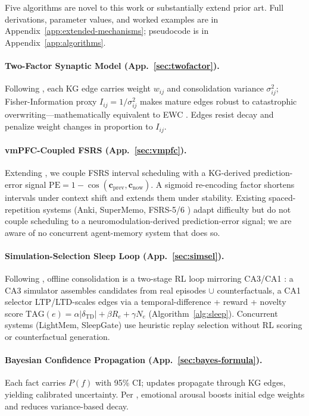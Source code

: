 \documentclass{article}
\begin{document}
Five algorithms are novel to this work or substantially extend prior
art. Full derivations, parameter values, and worked examples are in
Appendix~\ref{app:extended-mechanisms}; pseudocode is in
Appendix~\ref{app:algorithms}.

\paragraph{Two-Factor Synaptic Model (App.~\ref{sec:twofactor}).}
Following \citet{zenke2025}, each KG edge carries weight $w_{ij}$ and
consolidation variance $\sigma^2_{ij}$; Fisher-Information proxy
$I_{ij}=1/\sigma^2_{ij}$ makes mature edges robust to catastrophic
overwriting---mathematically equivalent to EWC
\citep{kirkpatrick2017,zenke2017}. Edges resist decay and penalize
weight changes in proportion to $I_{ij}$.

\paragraph{vmPFC-Coupled FSRS (App.~\ref{sec:vmpfc}).}
Extending \citet{zou2025}, we couple FSRS interval scheduling with a
KG-derived prediction-error signal
$\mathrm{PE}=1-\cos(\mathbf{c}_{\text{prev}},\mathbf{c}_{\text{now}})$.
A sigmoid re-encoding factor shortens intervals under context shift and
extends them under stability. Existing spaced-repetition systems
(Anki, SuperMemo, FSRS-5/6 \citep{vestige2026}) adapt difficulty but
do not couple scheduling to a neuromodulation-derived prediction-error
signal; we are aware of no concurrent agent-memory system that does so.

\paragraph{Simulation-Selection Sleep Loop (App.~\ref{sec:simsel}).}
Following \citet{chen2025,marche2025}, offline consolidation is a
two-stage RL loop mirroring CA3/CA1 \citep{ji2007,oneill2010}: a CA3
simulator assembles candidates from real episodes $\cup$ counterfactuals,
a CA1 selector LTP/LTD-scales edges via a temporal-difference + reward
+ novelty score $\mathrm{TAG}(e)=\alpha|\delta_{\mathrm{TD}}|+\beta R_e+\gamma N_e$
(Algorithm~\ref{alg:sleep}). Concurrent systems (LightMem, SleepGate)
use heuristic replay selection without RL scoring or counterfactual
generation.

\paragraph{Bayesian Confidence Propagation (App.~\ref{sec:bayes-formula}).}
Each fact carries $P(f)$ with 95\% CI; updates propagate through KG
edges, yielding calibrated uncertainty. Per \citet{mcgaugh2004},
emotional arousal boosts initial edge weights and reduces variance-based
decay.
\end{document}
